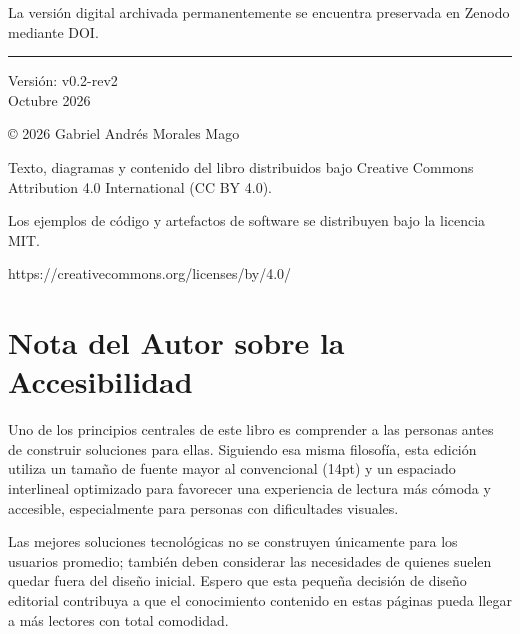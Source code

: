 \documentclass[14pt,a4paper,oneside]{extbook}
\begin{document}
\begin{center}
\begin{minipage}{0.85\textwidth}
La versión digital archivada permanentemente se encuentra
preservada en Zenodo mediante DOI.

\end{minipage}

\vspace{1.5cm}

\rule{0.7\textwidth}{0.4pt}

\vspace{0.5cm}

{\small
Versión: v0.2-rev2\\
Octubre 2026
}

\vspace{0.5cm}

{\small
© 2026 Gabriel Andrés Morales Mago
}

\vspace{0.5cm}

{\small
Texto, diagramas y contenido del libro distribuidos bajo
Creative Commons Attribution 4.0 International (CC BY 4.0).
}

\vspace{0.2cm}

{\small
Los ejemplos de código y artefactos de software se distribuyen
bajo la licencia MIT.
}

\vspace{0.2cm}

{\small
https://creativecommons.org/licenses/by/4.0/
}

\end{center}

\vspace*{\fill}

\cleardoublepage
\frontmatter
\tableofcontents
\chapter*{Nota del Autor sobre la Accesibilidad}
Uno de los principios centrales de este libro es comprender a las personas antes de construir soluciones para ellas. Siguiendo esa misma filosofía, esta edición utiliza un tamaño de fuente mayor al convencional (14pt) y un espaciado interlineal optimizado para favorecer una experiencia de lectura más cómoda y accesible, especialmente para personas con dificultades visuales.
\par\vspace{1em}
Las mejores soluciones tecnológicas no se construyen únicamente para los usuarios promedio; también deben considerar las necesidades de quienes suelen quedar fuera del diseño inicial. Espero que esta pequeña decisión de diseño editorial contribuya a que el conocimiento contenido en estas páginas pueda llegar a más lectores con total comodidad.
\newpage
\end{document}
